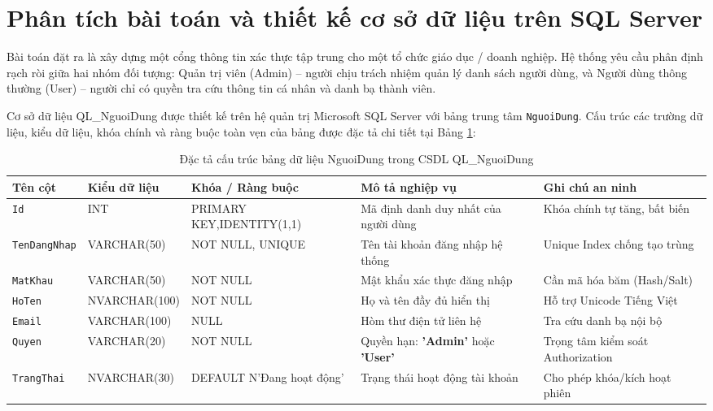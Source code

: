 \documentclass[12pt,a4paper]{report}
\begin{document}
\section{Phân tích bài toán và thiết kế cơ sở dữ liệu trên SQL Server}
Bài toán đặt ra là xây dựng một cổng thông tin xác thực tập trung cho một tổ chức giáo dục / doanh nghiệp. Hệ thống yêu cầu phân định rạch ròi giữa hai nhóm đối tượng: Quản trị viên (Admin) -- người chịu trách nhiệm quản lý danh sách người dùng, và Người dùng thông thường (User) -- người chỉ có quyền tra cứu thông tin cá nhân và danh bạ thành viên.

Cơ sở dữ liệu QL\_NguoiDung được thiết kế trên hệ quản trị Microsoft SQL Server với bảng trung tâm \texttt{NguoiDung}. Cấu trúc các trường dữ liệu, kiểu dữ liệu, khóa chính và ràng buộc toàn vẹn của bảng được đặc tả chi tiết tại Bảng \ref{tab:nguoidung_schema}:

\begin{table}[H]
\centering
\footnotesize
\setlength{\tabcolsep}{3.5pt}
\renewcommand{\arraystretch}{1.02}
\begin{tabularx}{\textwidth}{>{\raggedright\arraybackslash}p{2.2cm} >{\raggedright\arraybackslash}p{2.6cm} >{\raggedright\arraybackslash}p{2.5cm} >{\raggedright\arraybackslash}X >{\raggedright\arraybackslash}p{3.2cm}}
\toprule
\textbf{Tên cột} & \textbf{Kiểu dữ liệu} & \textbf{Khóa / Ràng buộc} & \textbf{Mô tả nghiệp vụ} & \textbf{Ghi chú an ninh} \\
\midrule
\texttt{Id} & INT & PRIMARY KEY,\newline IDENTITY(1,1) & Mã định danh duy nhất của người dùng & Khóa chính tự tăng, bất biến \\
\texttt{TenDangNhap} & VARCHAR(50) & NOT NULL, UNIQUE & Tên tài khoản đăng nhập hệ thống & Unique Index chống tạo trùng \\
\texttt{MatKhau} & VARCHAR(50) & NOT NULL & Mật khẩu xác thực đăng nhập & Cần mã hóa băm (Hash/Salt) \\
\texttt{HoTen} & NVARCHAR(100) & NOT NULL & Họ và tên đầy đủ hiển thị & Hỗ trợ Unicode Tiếng Việt \\
\texttt{Email} & VARCHAR(100) & NULL & Hòm thư điện tử liên hệ & Tra cứu danh bạ nội bộ \\
\texttt{Quyen} & VARCHAR(20) & NOT NULL & Quyền hạn: \textbf{'Admin'} hoặc \textbf{'User'} & Trọng tâm kiểm soát Authorization \\
\texttt{TrangThai} & NVARCHAR(30) & DEFAULT N'Đang hoạt động' & Trạng thái hoạt động tài khoản & Cho phép khóa/kích hoạt phiên \\
\bottomrule
\end{tabularx}
\caption{Đặc tả cấu trúc bảng dữ liệu NguoiDung trong CSDL QL\_NguoiDung}\label{tab:nguoidung_schema}
\end{table}
\end{document}
